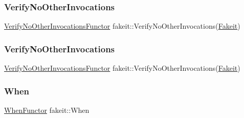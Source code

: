 \mbox{\label{namespacefakeit_a1fdaffe6f7ef1789d8ef832cc4cc19c3}} 
\subsubsection{\texorpdfstring{VerifyNoOtherInvocations}{VerifyNoOtherInvocations}\hspace{0.1cm}{\footnotesize\ttfamily [8/9]}}
{\footnotesize\ttfamily \mbox{\hyperlink{classfakeit_1_1VerifyNoOtherInvocationsFunctor}{Verify\+No\+Other\+Invocations\+Functor}} fakeit\+::\+Verify\+No\+Other\+Invocations(\mbox{\hyperlink{single__header_2tpunit_2fakeit_8hpp_a2b1f324059bec9d07841630bd5c2e7bc}{Fakeit}})\hspace{0.3cm}{\ttfamily [static]}}

\mbox{\label{namespacefakeit_a1fdaffe6f7ef1789d8ef832cc4cc19c3}} 
\subsubsection{\texorpdfstring{VerifyNoOtherInvocations}{VerifyNoOtherInvocations}\hspace{0.1cm}{\footnotesize\ttfamily [9/9]}}
{\footnotesize\ttfamily \mbox{\hyperlink{classfakeit_1_1VerifyNoOtherInvocationsFunctor}{Verify\+No\+Other\+Invocations\+Functor}} fakeit\+::\+Verify\+No\+Other\+Invocations(\mbox{\hyperlink{single__header_2tpunit_2fakeit_8hpp_a2b1f324059bec9d07841630bd5c2e7bc}{Fakeit}})\hspace{0.3cm}{\ttfamily [static]}}

\mbox{\label{namespacefakeit_ac9c6dd7971865edcc46e075d6408b1bb}} 
\subsubsection{\texorpdfstring{When}{When}\hspace{0.1cm}{\footnotesize\ttfamily [1/9]}}
{\footnotesize\ttfamily \mbox{\hyperlink{classfakeit_1_1WhenFunctor}{When\+Functor}} fakeit\+::\+When\hspace{0.3cm}{\ttfamily [static]}}

